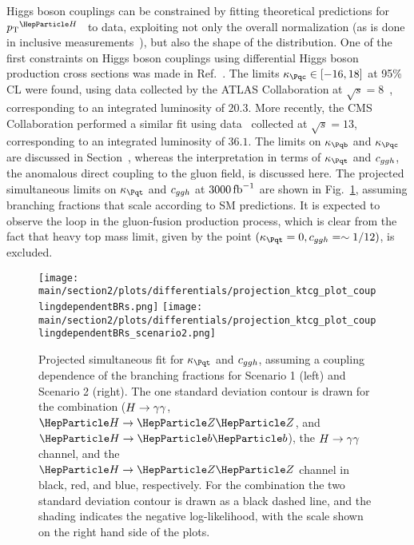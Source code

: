 
Higgs boson couplings can be constrained by fitting theoretical predictions for $\pTH$~\cite{Bishara:2016jga,Grazzini:2017szg,Grazzini:2016paz} to data, exploiting not only the overall normalization (as is done in inclusive measurements~\cite{%
Khachatryan:2016vau,%
Aad:2015zhl,%
CMS:2018lkl%
}), but also the shape of the distribution.
% 
One of the first constraints on Higgs boson couplings using differential Higgs boson production cross sections was made in Ref.~\cite{Bishara:2016jga}.
% 
The limits $\kappac \in [ -16, 18 ]$ at 95\% CL were found, using data collected by the ATLAS Collaboration at $\sqrt{s}=8$\UTeV~\cite{Aad:2015lha}, corresponding to an integrated luminosity of $20.3$\fbinv.
% 
More recently, the CMS Collaboration performed a similar fit using data~\cite{CMS-PAS-HIG-17-028} collected at $\sqrt{s}=13$\UTeV, corresponding to an integrated luminosity of $36.1$\fbinv.
% 
The limits on $\kappab$ and $\kappac$ are discussed in Section~, whereas the interpretation in terms of $\kappat$ and $c_{ggh}$, the anomalous direct coupling to the gluon field, is discussed here.
% 
The projected simultaneous limits on $\kappat$ and $c_{ggh}$ at $3000\mbox{\ensuremath{\,\text{fb}^\text{$-$1}}}$ are shown in Fig.~\ref{fig:ktcg_couplingdependentBRs}, assuming branching fractions that scale according to SM predictions.
% 
It is expected to observe the loop in the gluon-fusion production process, which is clear from the fact that heavy top mass limit, given by the point $(\kappat =0, \cg=\sim 1/12)$, is excluded.

\begin{figure}[hbtp]
  \begin{center}
    \texttt{[image: \\main/section2/plots/differentials/projection\_ktcg\_plot\_couplingdependentBRs.png]}
    \texttt{[image: \\main/section2/plots/differentials/projection\_ktcg\_plot\_couplingdependentBRs\_scenario2.png]}
    \caption{
        Projected simultaneous fit for $\kappat$ and $c_{ggh}$, assuming a coupling dependence of the branching fractions for Scenario 1 (left) and Scenario 2 (right).
        The one standard deviation contour is drawn for the combination ($H\rightarrow\gamma\gamma$, $\hzz$, and $\hbb$), the $H\rightarrow\gamma\gamma$ channel, and the $\hzz$ channel in black, red, and blue, respectively.
        For the combination the two standard deviation contour is drawn as a black dashed line, and the shading indicates the negative log-likelihood, with the scale shown on the right hand side of the plots.
        }
    \label{fig:ktcg_couplingdependentBRs}
  \end{center}
\end{figure}

